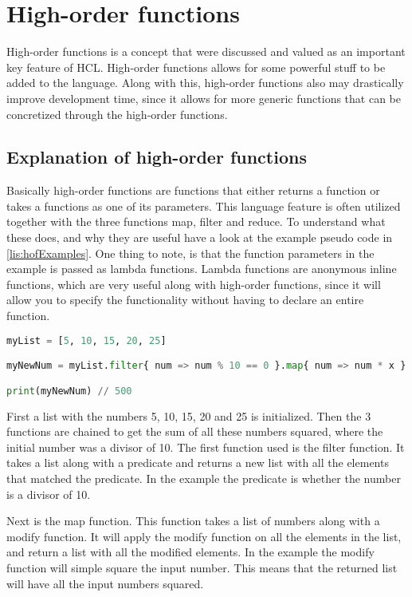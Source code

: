 \section{High-order functions}

High-order functions is a concept that were discussed and valued as an important key feature of HCL.
High-order functions allows for some powerful stuff to be added to the language.
Along with this, high-order functions also may drastically improve development time, since it allows for more generic functions that can be concretized through the high-order functions.

\subsection{Explanation of high-order functions}
Basically high-order functions are functions that either returns a function or takes a functions as one of its parameters. 
This language feature is often utilized together with the three functions map, filter and reduce. 
To understand what these does, and why they are useful have a look at the example pseudo code in \ref{lis:hofExamples}. 
One thing to note, is that the function parameters in the example is passed as lambda functions. 
Lambda functions are anonymous inline functions, which are very useful along with high-order functions, since it will allow you to specify the functionality without having to declare an entire function.

\begin{lstlisting}[language=Python,label=lis:hofExamples,caption=An example of the map\, filter and reduce functions.,firstnumber=1]
myList = [5, 10, 15, 20, 25]

myNewNum = myList.filter{ num => num % 10 == 0 }.map{ num => num * x }.reduce{ sumOfNums, num => sumOfNums + num }

print(myNewNum) // 500
\end{lstlisting}

First a list with the numbers 5, 10, 15, 20 and 25 is initialized. 
Then the 3 functions are chained to get the sum of all these numbers squared, where the initial number was a divisor of 10.
The first function used is the filter function. 
It takes a list along with a predicate and returns a new list with all the elements that matched the predicate. In the example the predicate is whether the number is a divisor of 10.

Next is the map function. 
This function takes a list of numbers along with a modify function. 
It will apply the modify function on all the elements in the list, and return a list with all the modified elements.
In the example the modify function will simple square the input number. 
This means that the returned list will have all the input numbers squared.

